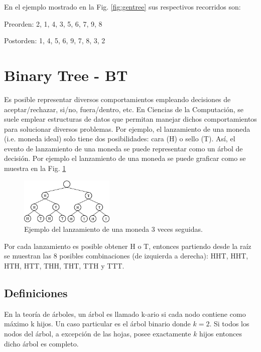 En el ejemplo mostrado en la Fig. \ref{fig:gentree} sus respectivos recorridos son:

Preorden: 2, 1, 4, 3, 5, 6, 7, 9, 8

Postorden: 1, 4, 5, 6, 9, 7, 8, 3, 2

\section{Binary Tree - BT}

Es posible representar diversos comportamientos empleando decisiones de aceptar/rechazar, si/no, fuera/dentro, etc. En Ciencias de la Computación, se suele emplear estructuras de datos que permitan manejar dichos comportamientos para solucionar diversos problemas. Por ejemplo, el lanzamiento de una moneda (i.e. moneda ideal) solo tiene dos posibilidades: cara (H) o sello (T). Así, el evento de lanzamiento de una moneda se puede representar como un árbol de decisión. Por ejemplo el lanzamiento de una moneda se puede graficar como se muestra en la Fig. \ref{fig:tree3coins}

\begin{figure}[htpb!]
  \begin{center}
    \includegraphics[width=0.4\textwidth]{images/gen3coins.eps}
  \end{center}
  \caption{Ejemplo del lanzamiento de una moneda 3 veces seguidas.}
  \label{fig:tree3coins}
\end{figure}

Por cada lanzamiento es posible obtener H o T, entonces partiendo desde la raíz se muestran las 8 posibles combinaciones (de izquierda a derecha): HHT, HHT, HTH, HTT, THH, THT, TTH y TTT.

\subsection{Definiciones}

En la teoría de árboles, un árbol es llamado k-ario si cada nodo contiene como máximo k hijos. Un caso particular es el árbol binario donde $k=2$. Si todos los nodos del árbol, a excepción de las hojas, posee exactamente $k$ hijos entonces dicho árbol es completo.

